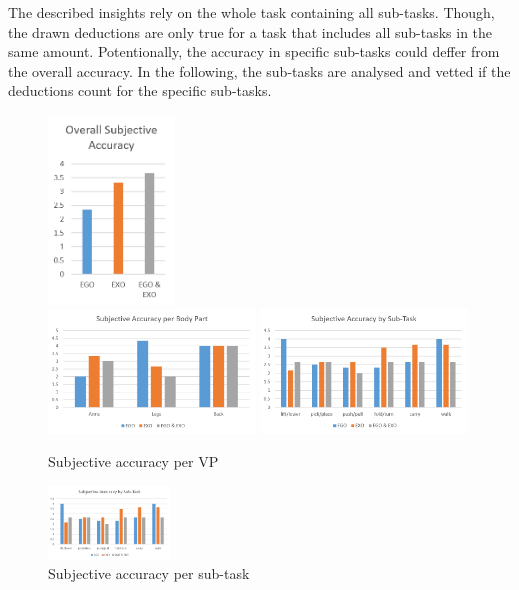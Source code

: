 The described insights rely on the whole task containing all sub-tasks. Though, the drawn deductions are only true for a task that includes all sub-tasks in the same amount. Potentionally, the accuracy in specific sub-tasks could deffer from the overall accuracy. In the following, the sub-tasks are analysed and vetted if the deductions count for the specific sub-tasks.
\begin{figure}[H]
	\centering
	\includegraphics[width=0.3\textwidth]{figures/overallSubjectiveAccuracy.png}\\ 
	\includegraphics[width=0.49\textwidth]{figures/subjectiveAccuracyPerBodyPart.png}
	\includegraphics[width=0.49\textwidth]{figures/subjectiveAccuracyBySubTask.png}
	\caption[Subjective accuracy per VP]{Subjective accuracy per VP}
	\label{fig:overallSubjectiveAccuracy}
\end{figure}

\begin{figure}[H]
	\centering
	\includegraphics[width=0.29\textwidth]{figures/subjectiveAccuracyBySubTask.png}
	\caption[Subjective accuracy per sub-task]{Subjective accuracy per sub-task}
	\label{fig:subjectiveAccuracybySubTask}
\end{figure}

